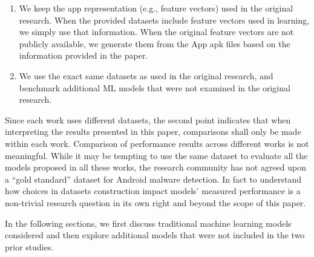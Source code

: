 \begin{enumerate}
\item We keep the app representation (e.g., feature vectors) used in the original research.
  When the provided datasets include feature vectors used in learning,
  we simply use that information. When the
original feature vectors are not publicly available, we generate
them from the App apk files based on the information provided in the paper. %


\item We use the exact same datasets as used in the original research,
  and benchmark additional
  ML models that were not examined in the original research.
\end{enumerate}


Since each work uses different datasets,
the second point indicates that when interpreting the
results presented in this paper, comparisons shall only be made within
each work. Comparison of performance results across different works is
not meaningful.
While it may be tempting to use the same dataset to evaluate all the
models proposed in all these works, the research community has not
agreed upon a ``gold standard'' dataset for Android malware detection.
In fact to understand how choices in datasets construction
impact models' measured performance is a non-trivial research question
in its own right and beyond the scope of this paper.





In the following sections, we first discuss 
traditional machine learning models considered and then explore additional models
that were not included in the two prior studies.




